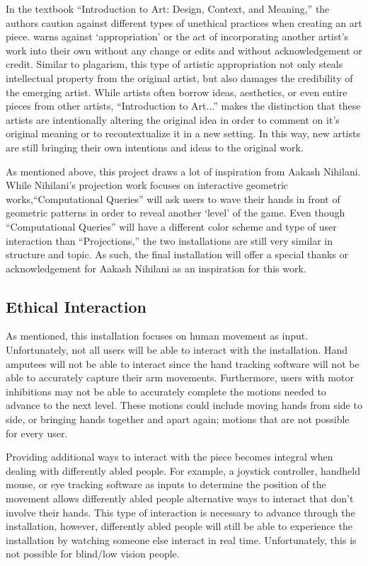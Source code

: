 \documentclass[10pt,twocolumn]{article}
\begin{document}
In the textbook ``Introduction to Art: Design, Context, and Meaning,'' \cite{blood_introduction_nodate}the authors caution against different types of unethical practices when creating an art piece. \citeauthor{blood_introduction_nodate} warns against `appropriation' or the act of incorporating another artist's work into their own without any change or edits and without acknowledgement or credit. Similar to plagarism, this type of artistic appropriation not only steals intellectual property from the original artist, but also damages the credibility of the emerging artist.  While artists often borrow ideas, aesthetics, or even entire pieces from other artists, ``Introduction to Art...'' makes the distinction that these artists are intentionally altering the original idea in order to comment on it's original meaning or to recontextualize it in a new setting. In this way, new artists are still bringing their own intentions and ideas to the original work.  

As mentioned above, this project draws a lot of inspiration from Aakash Nihilani.  While Nihilani's projection work focuses on interactive geometric works,``Computational Queries'' will ask users to wave their hands in front of geometric patterns in order to reveal another `level' of the game.  Even though ``Computational Queries'' will have a different color scheme and type of user interaction than ``Projections,'' the two installations are still very similar in structure and topic.  As such, the final installation will offer a special thanks or acknowledgement for Aakash Nihilani as an inspiration for this work. 

\subsection{Ethical Interaction}\label{sec:interaction}

As mentioned, this installation focuses on human movement as input.  Unfortunately, not all users will be able to interact with the installation.  Hand amputees will not be able to interact since the hand tracking software will not be able to accurately capture their arm movements. Furthermore, users with motor inhibitions may not be able to accurately complete the motions needed to advance to the next level.  These motions could include moving hands from side to side, or bringing hands together and apart again; motions that are not possible for every user. 

Providing additional ways to interact with the piece becomes integral when dealing with differently abled people. For example, a joystick controller, handheld mouse, or eye tracking software as inputs to determine the position of the movement allows differently abled people alternative ways to interact that don't involve their hands. This type of interaction is necessary to advance through the installation, however, differently abled people will still be able to experience the installation by watching someone else interact in real time. Unfortunately, this is not possible for blind/low vision people. 
\end{document}
